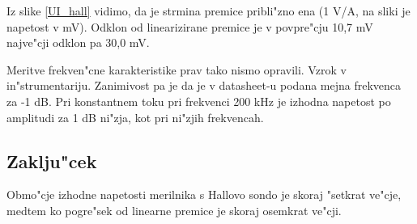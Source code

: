 \documentclass[10pt,a4paper]{article}
\begin{document}
	
	Iz slike \ref{UI_hall} vidimo, da je strmina premice pribli"zno ena (1 V/A, na sliki je napetost v mV). Odklon od linearizirane premice je v povpre"cju 10,7 mV najve"cji odklon pa 30,0 mV.
	
	Meritve frekven"cne karakteristike prav tako nismo opravili. Vzrok v in"strumentariju. Zanimivost pa je da je v datasheet-u podana mejna frekvenca za -1 dB. Pri konstantnem toku pri frekvenci 200 kHz je izhodna napetost po amplitudi za 1 dB ni"zja, kot pri ni"zjih frekvencah.
	
	
	\subsection{Zaklju"cek}
	 Obmo"cje izhodne napetosti merilnika s Hallovo sondo je skoraj "setkrat ve"cje, medtem ko pogre"sek od linearne premice je skoraj osemkrat ve"cji.
\end{document}
